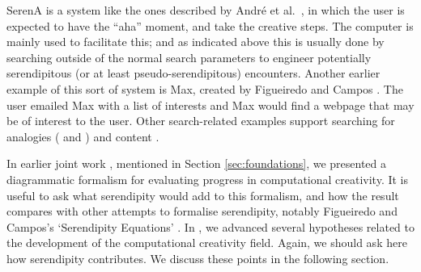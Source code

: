 SerenA is a system like the ones described by Andr{\'e} et
al.~\cite{andre2009discovery}, in which the user is expected to have
the ``aha'' moment, and take the creative steps.  The computer is
mainly used to facilitate this; and as indicated above this is usually
done by searching outside of the normal search parameters to engineer
potentially serendipitous (or at least pseudo-serendipitous)
encounters.  Another earlier example of this sort of system is {\sf
  Max}, created by Figueiredo and Campos \cite{Campos2002}.  The user
emailed {\sf Max} with a list of interests and {\sf Max} would find a
webpage that may be of interest to the user.  Other search-related
examples support searching for analogies (\cite{Donoghue2002} and
\cite{Donoghue2012}) and content \cite{Iaquinta2008}.

In earlier joint work \cite{colton-assessingprogress}, mentioned in
Section \ref{sec:foundations}, we presented a diagrammatic formalism
for evaluating progress in computational creativity.  It is useful to
ask what serendipity would add to this formalism, and how the result
compares with other attempts to formalise serendipity, notably
Figueiredo and Campos's `Serendipity Equations' \cite{Figueiredo2001}.
%
In \cite{stakeholder-groups-bookchapter}, we advanced several
hypotheses related to the development of the computational creativity
field.  Again, we should ask here how serendipity contributes.  We
discuss these points in the following section.
